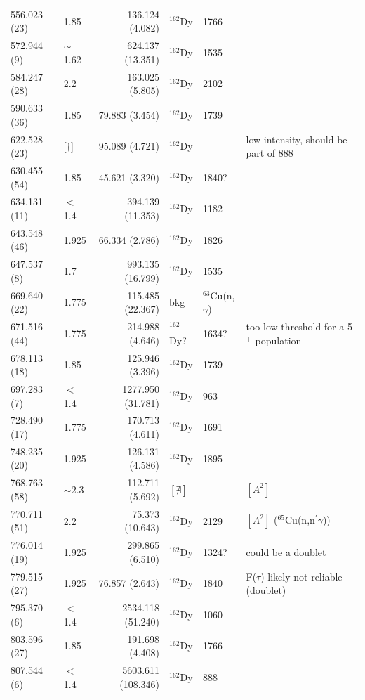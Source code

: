 \begin{landscape}
\begin{center}
\begin{longtable}{p{2.6cm}|p{1.2cm}|r|p{1.1cm}|p{2.0cm}|l}
   556.023 (23)  & 1.85       &136.124 (4.082)& $^{162}$Dy & 1766 & \\ %
   572.944 (9)   & $\sim$1.62 &624.137 (13.351)& $^{162}$Dy & 1535 & \\
   584.247 (28)  & 2.2        &163.025 (5.805)& $^{162}$Dy & 2102 & \\
   590.633 (36)  & 1.85       &79.883 (3.454)& $^{162}$Dy & 1739 & \\
   622.528 (23)  & [$\dagger$]  & 95.089 (4.721)& $^{162}$Dy & & low intensity, should be part of 888 \\
   630.455 (54)  & 1.85       & 45.621 (3.320)& $^{162}$Dy & 1840? & \\
   634.131 (11)  & $<$1.4     &394.139 (11.353)& $^{162}$Dy & 1182 & \\
   643.548 (46)  & 1.925      & 66.334 (2.786)& $^{162}$Dy & 1826 & \\
   647.537 (8)   & 1.7        &993.135 (16.799)& $^{162}$Dy & 1535 & \\
   669.640 (22)  & 1.775      &115.485 (22.367)& bkg & $^{63}$Cu(n,$\gamma$) & \\
   671.516 (44)  & 1.775      & 214.988 (4.646)& $^{162}$Dy? & 1634? & too low threshold for a 5$^+$ population \\
   678.113 (18)  & 1.85       & 125.946 (3.396)& $^{162}$Dy & 1739 & \\
   697.283 (7)   & $<$1.4     &1277.950 (31.781)& $^{162}$Dy & 963 & \\
   728.490 (17)  & 1.775      &170.713 (4.611)& $^{162}$Dy & 1691 & \\
   748.235 (20)  & 1.925      &126.131 (4.586)& $^{162}$Dy & 1895 & \\
   768.763 (58)  & $\sim$2.3  &112.711 (5.692)& $[\nexists]$ & &$[A^2]$ \\
   770.711 (51)  & 2.2        & 75.373 (10.643)& $^{162}$Dy & 2129 & $[A^2]$ ($^{65}$Cu(n,n$^\prime\gamma$))\\
   776.014 (19)  & 1.925      &299.865 (6.510)& $^{162}$Dy & 1324? & could be a doublet \\
   779.515 (27)  & 1.925      & 76.857 (2.643)& $^{162}$Dy & 1840 & F($\tau$) likely not reliable (doublet)\\
   795.370 (6)   & $<$1.4     &2534.118 (51.240)& $^{162}$Dy & 1060 & \\
   803.596 (27)  & 1.85       & 191.698 (4.408)& $^{162}$Dy & 1766 & \\
   807.544 (6)   & $<$1.4     &5603.611 (108.346)& $^{162}$Dy & 888 & \\

\end{longtable}
\end{center}
\end{landscape}
